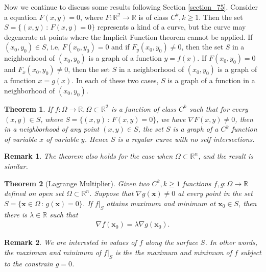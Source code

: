 \documentclass[11pt]{book}
\newtheorem{theorem}{Theorem}[chapter]
\newtheorem{remark}{Remark}[chapter]
\theoremstyle{definition}
\numberwithin{equation}{chapter}
\begin{document}
Now we continue to discuss some results following Section \ref{section_75}. Consider a equation $F(x,y) = 0$, where $F:\mathbb{R}^2 \to \mathbb{R}$ is of class $C^k, k \geq 1$. Then the set $S = \{(x,y) \,:\, F(x,y) = 0\}$ represents a kind of a curve, but the curve may degenerate at points where the Implicit Function theorem cannot be applied. If $(x_0,y_0) \in S$, i.e, $F(x_0,y_0) = 0$ and if $F_y(x_0,y_0) \neq 0$, then the set $S$ in a neighborhood of $(x_0,y_0)$ is a graph of a function $y = f(x)$. If $F(x_0,y_0) = 0$ and $F_x(x_0,y_0) \neq 0$, then the set $S$ in a neighborhood of $(x_0,y_0)$ is a graph of a function $x = g(x)$. In each of these two cases, $S$ is a graph of a function in a neighborhood of $(x_0,y_0)$.

\medskip

\begin{theorem}
If $f: \Omega \to \mathbb{R}, \Omega \subset \mathbb{R}^2$ is a function of class $C^k$ such that for every $(x,y) \in S$, where $S = \{(x,y) \,:\, F(x,y) = 0\}$, we have $\nabla F(x,y) \neq 0$, then in a neighborhood of any point $(x,y) \in S$, the set $S$ is a graph of a $C^k$ function of variable $x$ of variable $y$. Hence $S$ is a regular curve with no self intersections.
\end{theorem}

\begin{remark}
The theorem also holds for the case when $\Omega \subset \mathbb{R}^n$, and the result is similar.
\end{remark}

\medskip

\begin{theorem}[Lagrange Multiplier]\label{th_726}
Given two $C^k, k\geq 1$ functions $f,g: \Omega \to \mathbb{R}$ defined on open set $\Omega \subset \mathbb{R}^n$. Suppose that $\nabla g(\mathbf{x}) \neq 0$ at every point in the set $S = \{\mathbf{x} \in \Omega \,:\, g(\mathbf{x}) = 0\}$. If $f|_S$ attains maximum and minimum at $\mathbf{x}_0 \in S$, then there is $\lambda \in \mathbb{R}$ such that 
\begin{align*}
    \nabla f(\mathbf{x}_0) = \lambda \nabla g(\mathbf{x}_0).
\end{align*}
\end{theorem}

\begin{remark}
We are interested in values of $f$ along the surface $S$. In other words, the maximum and minimum of $f|_S$ is the the maximum and minimum of $f$ subject to the constrain $g = 0$.
\end{remark}
\end{document}

